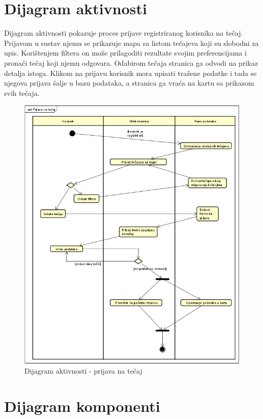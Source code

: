 			
		
		\section{Dijagram aktivnosti}

            \noindent Dijagram aktivnosti pokazuje proces prijave registriranog korisnika na tečaj. Prijavom u sustav njemu se prikazuje mapa sa listom tečajeva koji su slobodni za upis. Korištenjem filtera on može prilagoditi rezultate svojim preferencijama i pronaći tečaj koji njemu odgovara. Odabirom tečaja stranica ga odvodi na prikaz detalja istoga. Klikom na prijavu korisnik mora upisati tražene podatke i tada se njegova prijava šalje u bazu podataka, a stranica ga vraća na kartu sa prikazom svih tečaja. 

            \begin{figure}[H]
			\includegraphics[scale=0.4]{slike/DijagramAktivnosti.PNG} %
			\centering
			\caption{Dijagram aktivnosti - prijava na tečaj}
			\label{fig:stanje}
		\end{figure}
		
		\section{Dijagram komponenti}
		
		
